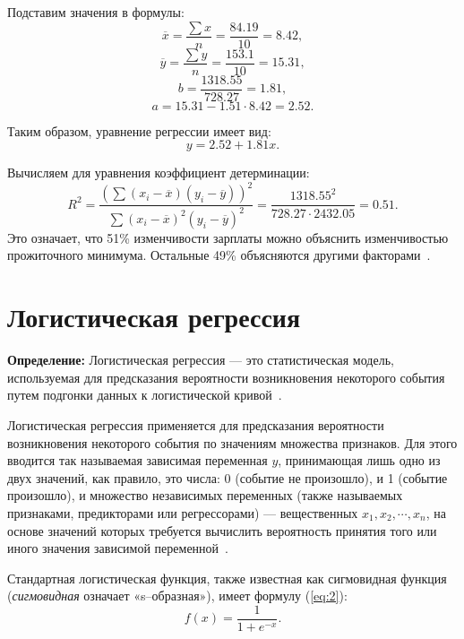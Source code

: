 Подставим значения в формулы:
\begin{equation}
    \overline{x} = \frac{\sum x}{n} = \frac{84.19}{10} = 8.42,
\end{equation}
\begin{equation}
    \overline{y} = \frac{\sum y}{n} = \frac{153.1}{10} = 15.31,
\end{equation}
\begin{equation}
    b = \frac{1318.55}{728.27} = 1.81,
\end{equation}
\begin{equation}
    a = 15.31 - 1.51 \cdot 8.42 = 2.52.
\end{equation}

Таким образом, уравнение регрессии имеет вид:
\begin{equation}
    y = 2.52 + 1.81x.
\end{equation}

Вычисляем для уравнения коэффициент детерминации:
\begin{equation}
    R^2 = \frac{(\sum(x_i - \overline{x})(y_i - \overline{y}))^2}{\sum (x_i - \overline{x})^2(y_i - \overline{y})^2} = \frac{1318.55^2}{728.27 \cdot 2432.05} = 0.51.
\end{equation}
Это означает, что 51\% изменчивости зарплаты можно объяснить изменчивостью прожиточного минимума.
Остальные 49\% объясняются другими факторами~\cite{plehanov}.

\section{Логистическая регрессия}

\textbf{ Определение:} Логистическая регрессия --- это статистическая модель, используемая для предсказания вероятности возникновения некоторого события путем подгонки данных к логистической кривой~\cite{kras}.

Логистическая регрессия применяется для предсказания вероятности возникновения некоторого события по значениям множества признаков.
Для этого вводится так называемая зависимая переменная $y$, принимающая лишь одно из двух значений, как правило, это числа: 0 (событие не произошло), и 1 (событие произошло), и множество независимых переменных (также называемых признаками, предикторами или регрессорами) --- вещественных $x_1, x_2, \cdots, x_n$, на основе значений которых требуется вычислить вероятность принятия того или иного значения зависимой переменной~\cite{kras}.

Стандартная логистическая функция, также известная как сигмовидная функция (\textit{сигмовидная} означает «s--образная»), имеет формулу (\ref{eq:2}):
\begin{equation}
    f(x) = \frac{1}{1 + e^{-x}}.
    \label{eq:2}
\end{equation}

